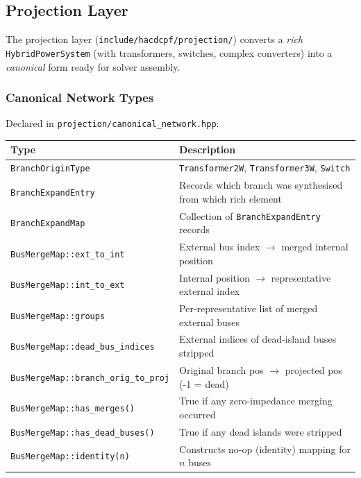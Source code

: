 \subsection{Projection Layer}
\label{sec:projection}

The projection layer (\texttt{include/hacdcpf/projection/}) converts a
\emph{rich} \texttt{HybridPowerSystem} (with transformers, switches, complex
converters) into a \emph{canonical} form ready for solver assembly.

\subsubsection{Canonical Network Types}

Declared in \texttt{projection/canonical\_network.hpp}:

\begin{longtable}{ll}
\hline\hline
\textbf{Type} & \textbf{Description} \\
\hline\endhead\hline\endfoot
\texttt{BranchOriginType} & \texttt{Transformer2W}, \texttt{Transformer3W}, \texttt{Switch} \\
\texttt{BranchExpandEntry} & Records which branch was synthesised from which rich element \\
\texttt{BranchExpandMap} & Collection of \texttt{BranchExpandEntry} records \\
\hline
\texttt{BusMergeMap::ext\_to\_int} & External bus index $\to$ merged internal position \\
\texttt{BusMergeMap::int\_to\_ext} & Internal position $\to$ representative external index \\
\texttt{BusMergeMap::groups} & Per-representative list of merged external buses \\
\texttt{BusMergeMap::dead\_bus\_indices} & External indices of dead-island buses stripped \\
\texttt{BusMergeMap::branch\_orig\_to\_proj} & Original branch pos $\to$ projected pos (-1 = dead) \\
\texttt{BusMergeMap::has\_merges()} & True if any zero-impedance merging occurred \\
\texttt{BusMergeMap::has\_dead\_buses()} & True if any dead islands were stripped \\
\texttt{BusMergeMap::identity(n)} & Constructs no-op (identity) mapping for $n$ buses \\
\hline\hline
\end{longtable}

